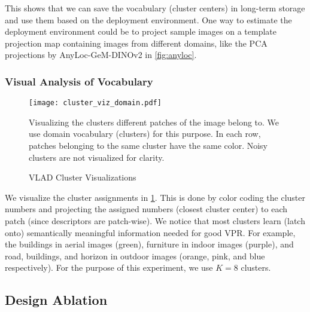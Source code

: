 This shows that we can save the vocabulary (cluster centers) in
long-term storage and use them based on the deployment environment.
One way to estimate the deployment environment could be to project
sample images on a template projection map containing images from
different domains, like the PCA projections by AnyLoc-GeM-DINOv2 in
\cref{fig:anyloc}.

\subsubsection{Visual Analysis of Vocabulary}

\begin{figure}
    \centering
    \texttt{[image: cluster\_viz\_domain.pdf]}
    \caption{VLAD Cluster Visualizations}
    \small
        Visualizing the clusters different patches of the image belong
        to. We use domain vocabulary (clusters) for this purpose. In 
        each row, patches belonging to the same cluster have the same 
        color. Noisy clusters are not visualized for clarity.
    \label{fig:anyloc_cluster_viz}
\end{figure}

We visualize the cluster assignments in \cref{fig:anyloc_cluster_viz}.
This is done by color coding the cluster numbers and projecting the
assigned numbers (closest cluster center) to each patch (since
descriptors are patch-wise). We notice that most clusters learn (latch
onto) semantically meaningful information needed for good VPR. For
example, the buildings in aerial images (green), furniture in indoor
images (purple), and road, buildings, and horizon in outdoor images
(orange, pink, and blue respectively). For the purpose of this
experiment, we use $K = 8$ clusters.

\subsection{Design Ablation}
\label{subsec:design-ablations}

